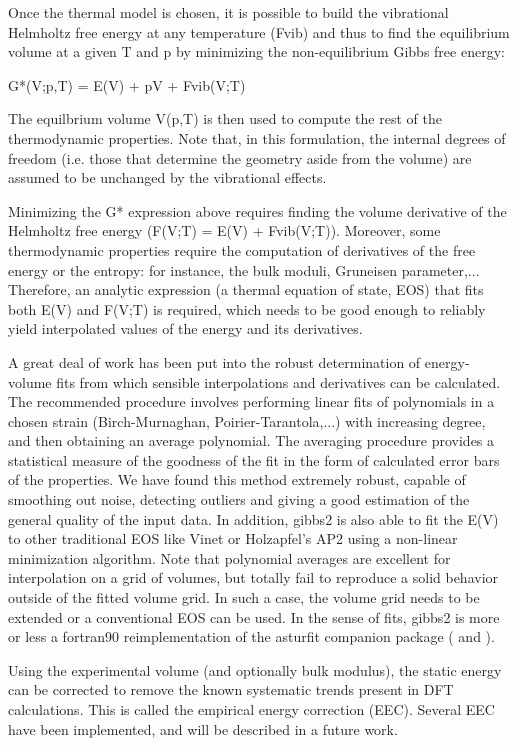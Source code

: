 \documentclass[a4paper]{article}
\begin{document}
Once the thermal model is chosen, it is possible to build the
vibrational Helmholtz free energy at any temperature (Fvib) and thus
to find the equilibrium volume at a given T and p by minimizing the
non-equilibrium Gibbs free energy:

G*(V;p,T) = E(V) + pV + Fvib(V;T)

The equilbrium volume V(p,T) is then used to compute the rest of the
thermodynamic properties. Note that, in this formulation, the internal
degrees of freedom (i.e. those that determine the geometry aside from
the volume) are assumed to be unchanged by the vibrational effects.

Minimizing the G* expression above requires finding the volume
derivative of the Helmholtz free energy (F(V;T) = E(V) +
Fvib(V;T)). Moreover, some thermodynamic properties require the
computation of derivatives of the free energy or the entropy: for
instance, the bulk moduli, Gruneisen parameter,... Therefore, an
analytic expression (a thermal equation of state, EOS) that fits both
E(V) and F(V;T) is required, which needs to be good enough to reliably
yield interpolated values of the energy and its derivatives.

A great deal of work has been put into the robust determination of
energy-volume fits from which sensible interpolations and derivatives
can be calculated. The recommended procedure involves performing
linear fits of polynomials in a chosen strain (Birch-Murnaghan,
Poirier-Tarantola,...) with increasing degree, and then obtaining an
average polynomial. The averaging procedure provides a statistical
measure of the goodness of the fit in the form of calculated error
bars of the properties. We have found this method extremely robust,
capable of smoothing out noise, detecting outliers and giving a good
estimation of the general quality of the input data. In addition,
gibbs2 is also able to fit the E(V) to other traditional EOS like
Vinet or Holzapfel's AP2 using a non-linear minimization
algorithm. Note that polynomial averages are excellent for
interpolation on a grid of volumes, but totally fail to reproduce a
solid behavior outside of the fitted volume grid. In such a case, the
volume grid needs to be extended or a conventional EOS can be used. In
the sense of fits, gibbs2 is more or less a fortran90 reimplementation
of the asturfit companion package (\cite{fit1} and \cite{fit2}).

Using the experimental volume (and optionally bulk modulus), the
static energy can be corrected to remove the known systematic trends
present in DFT calculations. This is called the empirical energy
correction (EEC). Several EEC have been implemented, and will be
described in a future work.
\end{document}
